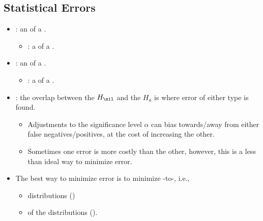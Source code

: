 \begin{itemize}
  \subsection{Statistical Errors}
  \begin{itemize}
    \item {}: an \textbf{} of a .
      \begin{itemize}
        \item {}: a  of a .
      \end{itemize}
    \item {}: an \textbf{} of a .
      \begin{itemize}
        \item {}: a  of a .
      \end{itemize}
    \item {}: the overlap between the \(H_\nil\) and the \(H_a\) is where error of either type is found.
      \begin{itemize}
        \item Adjustments to the significance level \(\alpha \) can bias towards/away from either false negatives/positives, at the cost of increasing the other.
        \item Sometimes one error is more costly than the other, however, this is a less than ideal way to minimize error.
      \end{itemize}
      \item The best way to minimize error is to minimize -to-, i.e.,
      \begin{itemize}
        \item {} distributions ()
        \item {} of the distributions ().
      \end{itemize}
    \vspace{24pt}  
    \begin{center}
      \hspace{-26pt}
    \end{center}
  \end{itemize}
  
\end{itemize}

